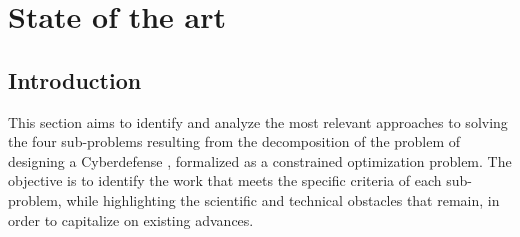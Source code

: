 \clearpage
\thispagestyle{empty}
\null
\newpage

\cleardoublepage
{}
\part{State of the art}
\label{part:state_art}

\clearpage
\thispagestyle{empty}
\null
\newpage


\chapter*{Introduction}

\noindent
This section aims to identify and analyze the most relevant approaches to solving the four sub-problems resulting from the decomposition of the problem of designing a Cyberdefense , formalized as a constrained optimization problem. The objective is to identify the work that meets the specific criteria of each sub-problem, while highlighting the scientific and technical obstacles that remain, in order to capitalize on existing advances.

